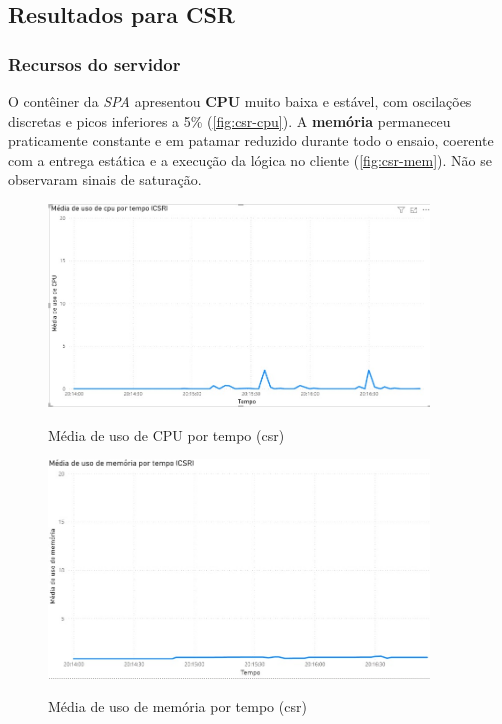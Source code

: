 \subsection{Resultados para CSR}
\label{subsec:resultados-csr}

\subsubsection*{Recursos do servidor}
O contêiner da \emph{SPA} apresentou \textbf{CPU} muito baixa e estável, com oscilações discretas e picos inferiores a 5\% (\autoref{fig:csr-cpu}). A \textbf{memória} permaneceu praticamente constante e em patamar reduzido durante todo o ensaio, coerente com a entrega estática e a execução da lógica no cliente (\autoref{fig:csr-mem}). Não se observaram sinais de saturação.

\begin{figure}[H]
\centering
\caption{Média de uso de CPU por tempo (\acrshort{csr})}
\includegraphics[width=0.9\textwidth]{media/uso_cpu_csr.jpeg}
\label{fig:csr-cpu}
\end{figure}

\begin{figure}[H]
\centering
\caption{Média de uso de memória por tempo (\acrshort{csr})}
\includegraphics[width=0.9\textwidth]{media/uso_memoria_csr.jpeg}
\label{fig:csr-mem}
\end{figure}

